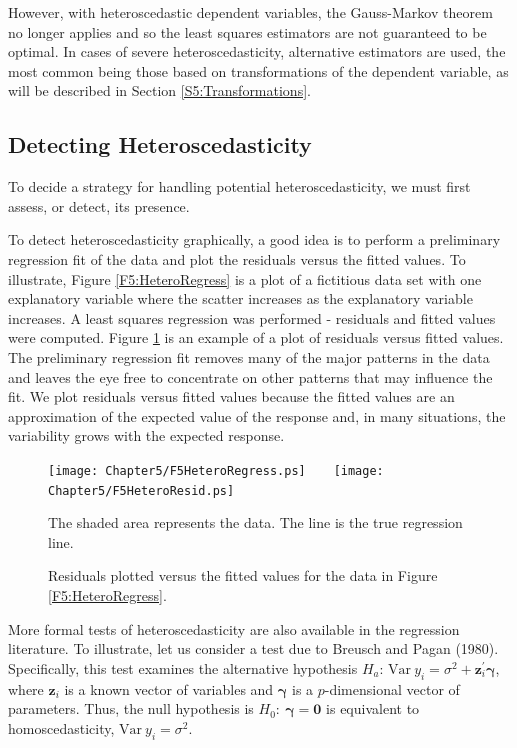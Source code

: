 However, with heteroscedastic dependent variables, the Gauss-Markov
theorem no longer applies and so the least squares estimators are
not guaranteed to be optimal. In cases of severe heteroscedasticity,
alternative estimators are used, the most common being those based
on transformations of the dependent variable, as will be described
in Section \ref{S5:Transformations}.

\subsection{Detecting Heteroscedasticity}

To decide a strategy for handling potential heteroscedasticity, we
must first assess, or detect, its presence.

To detect heteroscedasticity graphically, a good idea is to perform
a preliminary regression fit of the data and plot the residuals
versus the fitted values. To illustrate, Figure
\ref{F5:HeteroRegress} is a plot of a fictitious data set with one
explanatory variable where the scatter increases as the explanatory
variable increases. A least squares regression was performed -
residuals and fitted values were computed. Figure
\ref{F5:HeteroResid} is an example of a plot of residuals versus
fitted values. The preliminary regression fit removes many of the
major patterns in the data and leaves the eye free to concentrate on
other patterns that may influence the fit. We plot residuals versus
fitted values because the fitted values are an approximation of the
expected value of the response and, in many situations, the
variability grows with the expected response.


\begin{figure}[htp]
    \texttt{[image: Chapter5/F5HeteroRegress.ps]}
    $~~~~~~$
    \texttt{[image: Chapter5/F5HeteroResid.ps]}    \hfill
      \parbox[t]{2.5in}{\caption{\label{F5:HeteroRegress} \small  The shaded area
represents the data. The line is the true regression line.}} \hfill
        \parbox[t]{2.5in}{ \caption{\label{F5:HeteroResid} \small  Residuals plotted
versus the fitted values for the data in Figure
\ref{F5:HeteroRegress}.}}
\end{figure}

More formal tests of heteroscedasticity are also available in the
regression literature. To illustrate, let us consider a test due to
Breusch and Pagan (1980). Specifically, this test examines the
alternative hypothesis $H_a$: $\mathrm{Var~} y_i = \sigma^2 +
\mathbf{z}_i^{\prime} \boldsymbol \gamma $, where $\mathbf{z}_i$ is
a known vector of variables and $\boldsymbol \gamma$ is a
$p$-dimensional vector of parameters. Thus, the null hypothesis is
$H_0:~ \boldsymbol \gamma = \mathbf{0}$ is equivalent to
homoscedasticity,  $\mathrm{Var~} y_i = \sigma^2.$

